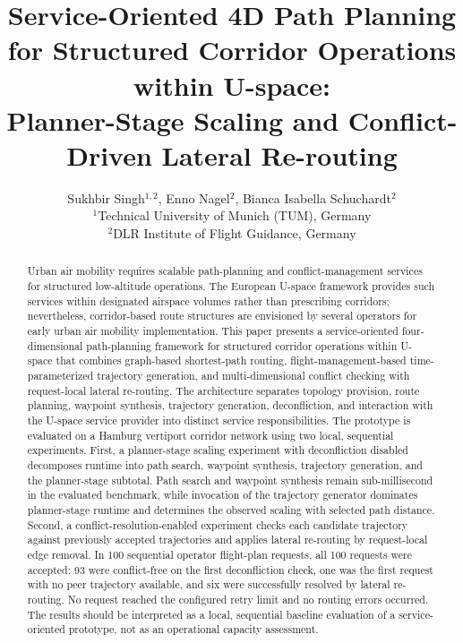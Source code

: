 \documentclass[11pt,a4paper]{article}
\title{Service-Oriented 4D Path Planning for Structured Corridor Operations within U-space:\\
Planner-Stage Scaling and Conflict-Driven Lateral Re-routing}
\author{
Sukhbir Singh$^{1,2}$,
Enno Nagel$^{2}$,
Bianca Isabella Schuchardt$^{2}$ \\[6pt]
\small $^{1}$Technical University of Munich (TUM), Germany \\
\small $^{2}$DLR Institute of Flight Guidance, Germany
}
\date{}
\begin{document}
\maketitle
\begin{abstract}
Urban air mobility requires scalable path-planning and conflict-management services for structured low-altitude operations. The European U-space framework provides such services within designated airspace volumes rather than prescribing corridors; nevertheless, corridor-based route structures are envisioned by several operators for early urban air mobility implementation. This paper presents a service-oriented four-dimensional path-planning framework for structured corridor operations within U-space that combines graph-based shortest-path routing, flight-management-based time-parameterized trajectory generation, and multi-dimensional conflict checking with request-local lateral re-routing. The architecture separates topology provision, route planning, waypoint synthesis, trajectory generation, deconfliction, and interaction with the U-space service provider into distinct service responsibilities. The prototype is evaluated on a Hamburg vertiport corridor network using two local, sequential experiments. First, a planner-stage scaling experiment with deconfliction disabled decomposes runtime into path search, waypoint synthesis, trajectory generation, and the planner-stage subtotal. Path search and waypoint synthesis remain sub-millisecond in the evaluated benchmark, while invocation of the trajectory generator dominates planner-stage runtime and determines the observed scaling with selected path distance. Second, a conflict-resolution-enabled experiment checks each candidate trajectory against previously accepted trajectories and applies lateral re-routing by request-local edge removal. In 100 sequential operator flight-plan requests, all 100 requests were accepted: 93 were conflict-free on the first deconfliction check, one was the first request with no peer trajectory available, and six were successfully resolved by lateral re-routing. No request reached the configured retry limit and no routing errors occurred. The results should be interpreted as a local, sequential baseline evaluation of a service-oriented prototype, not as an operational capacity assessment.
\end{abstract}













\end{document}
